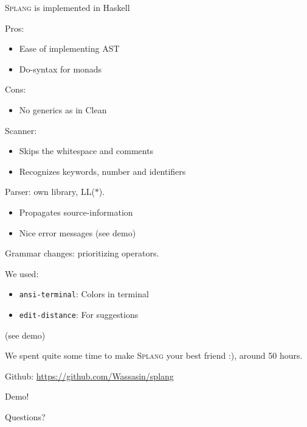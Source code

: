 \documentclass[14pt]{beamer}
\title{\splang}
\author{Wouter Geraedts \and Joshua Moerman}
\institute{Radboud Universiteit Nijmegen}
\date{}
\newcommand{\splang}{\textsc{Splang}\xspace}
\begin{document}
\begin{frame}
\titlepage
\end{frame}


\begin{frame}
\splang is implemented in Haskell
\bigskip

Pros:
\begin{itemize}
	\item Ease of implementing AST
	\item Do-syntax for monads
\end{itemize}

Cons:
\begin{itemize}
	\item No generics as in Clean
\end{itemize}
\end{frame}


\begin{frame}
Scanner:
\begin{itemize}
	\item Skips the whitespace and comments
	\item Recognizes keywords, number and identifiers
\end{itemize}
\bigskip

Parser: own library, LL($\ast$).
\begin{itemize}
	\item Propagates source-information
	\item Nice error messages (see demo)
\end{itemize}
\bigskip

Grammar changes: prioritizing operators.
\end{frame}


\begin{frame}
We used:
\begin{itemize}
	\item \texttt{ansi-terminal}: Colors in terminal
	\item \texttt{edit-distance}: For suggestions
\end{itemize}
(see demo)
\bigskip

We spent quite some time to make \splang your best friend :), around 50 hours.
\bigskip

Github: \url{https://github.com/Wassasin/splang}
\end{frame}


\begin{frame}
\begin{center}
\Huge Demo!
\end{center}
\end{frame}


\begin{frame}
\begin{center}
\Huge Questions?
\end{center}
\end{frame}
\end{document}
